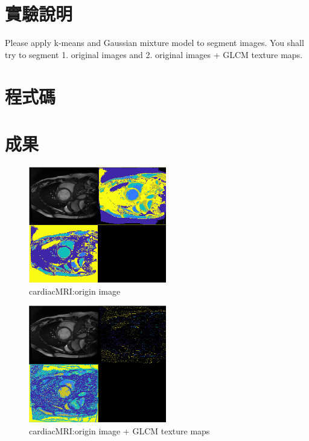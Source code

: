 \documentclass[conference]{IEEEtran}
\begin{document}


\section{實驗說明}
Please apply k-means and Gaussian mixture model to segment images. You shall try to segment 1. original images and 2. original images + GLCM texture maps. 

\section{程式碼}


\section{成果}

\begin{figure}[H]
\centerline{\includegraphics[width=6cm]{a1.png}}
\caption{cardiacMRI:origin image}
\label{cardiacMRI:origin image}
\end{figure}

\begin{figure}[H]
\centerline{\includegraphics[width=6cm]{a2.png}}
\caption{cardiacMRI:origin image + GLCM texture maps}
\label{cardiacMRI:origin image + GLCM texture maps}
\end{figure}
\end{document}
